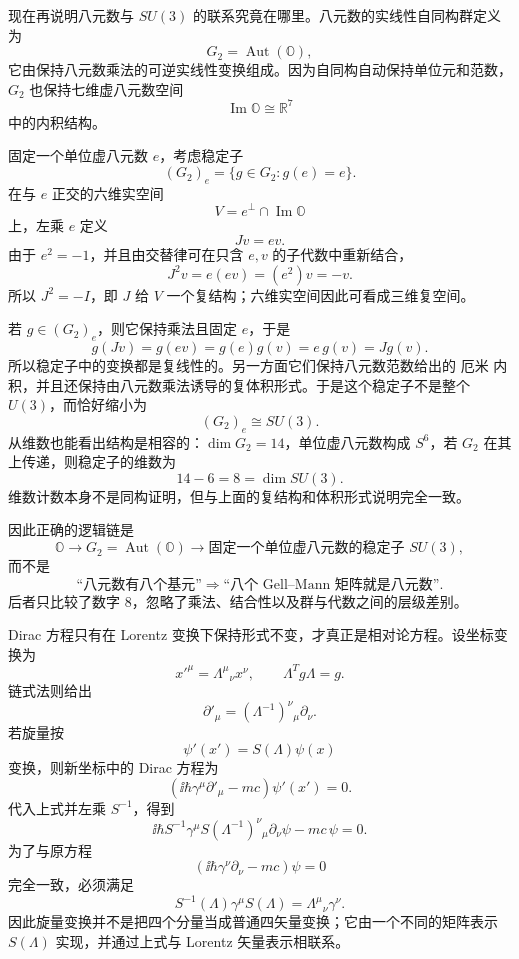 现在再说明八元数与 $SU(3)$ 的联系究竟在哪里。八元数的实线性自同构群定义为
\[
G_2=\operatorname{Aut}(\mathbb O),
\]
它由保持八元数乘法的可逆实线性变换组成。因为自同构自动保持单位元和范数，$G_2$ 也保持七维虚八元数空间
\[
\operatorname{Im}\mathbb O\cong\mathbb R^7
\]
中的内积结构。

固定一个单位虚八元数 $e$，考虑稳定子
\[
(G_2)_e
=\{g\in G_2:g(e)=e\}.
\]
在与 $e$ 正交的六维实空间
\[
V=e^\perp\cap\operatorname{Im}\mathbb O
\]
上，左乘 $e$ 定义
\[
Jv=ev.
\]
由于 $e^2=-1$，并且由交替律可在只含 $e,v$ 的子代数中重新结合，
\[
J^2v=e(ev)=(e^2)v=-v.
\]
所以 $J^2=-I$，即 $J$ 给 $V$ 一个复结构；六维实空间因此可看成三维复空间。

若 $g\in(G_2)_e$，则它保持乘法且固定 $e$，于是
\[
g(Jv)=g(ev)=g(e)g(v)=e\,g(v)=Jg(v).
\]
所以稳定子中的变换都是复线性的。另一方面它们保持八元数范数给出的 厄米 内积，并且还保持由八元数乘法诱导的复体积形式。于是这个稳定子不是整个 $U(3)$，而恰好缩小为
\begin{equation*}\boxed{(G_2)_e\cong SU(3).}\end{equation*}
从维数也能看出结构是相容的：$\dim G_2=14$，单位虚八元数构成 $S^6$，若 $G_2$ 在其上传递，则稳定子的维数为
\[
14-6=8=\dim SU(3).
\]
维数计数本身不是同构证明，但与上面的复结构和体积形式说明完全一致。

因此正确的逻辑链是
\[
\mathbb O
\longrightarrow
G_2=\operatorname{Aut}(\mathbb O)
\longrightarrow
\text{固定一个单位虚八元数的稳定子 }SU(3),
\]
而不是
\[
\text{“八元数有八个基元”}
\Longrightarrow
\text{“八个 Gell--Mann 矩阵就是八元数”}.
\]
后者只比较了数字 $8$，忽略了乘法、结合性以及群与代数之间的层级差别。

Dirac 方程只有在 Lorentz 变换下保持形式不变，才真正是相对论方程。设坐标变换为
\[
x'^\mu=\Lambda^\mu{}_{\nu}x^\nu,
\qquad
\Lambda^Tg\Lambda=g.
\]
链式法则给出
\[
\partial'_\mu=(\Lambda^{-1})^\nu{}_{\mu}\partial_\nu.
\]
若旋量按
\[
\psi'(x')=S(\Lambda)\psi(x)
\]
变换，则新坐标中的 Dirac 方程为
\[
(\ii\hbar\gamma^\mu\partial'_\mu-mc)\psi'(x')=0.
\]
代入上式并左乘 $S^{-1}$，得到
\[
\ii\hbar S^{-1}\gamma^\mu S(\Lambda^{-1})^\nu{}_{\mu}\partial_\nu\psi-mc\,\psi=0.
\]
为了与原方程
\[
(\ii\hbar\gamma^\nu\partial_\nu-mc)\psi=0
\]
完全一致，必须满足
\begin{equation}
\boxed{
S^{-1}(\Lambda)\gamma^\mu S(\Lambda)
=\Lambda^\mu{}_{\nu}\gamma^\nu
}.
\label{eq:spinor-lorentz-intertwiner}
\end{equation}
因此旋量变换并不是把四个分量当成普通四矢量变换；它由一个不同的矩阵表示 $S(\Lambda)$ 实现，并通过上式与 Lorentz 矢量表示相联系。


